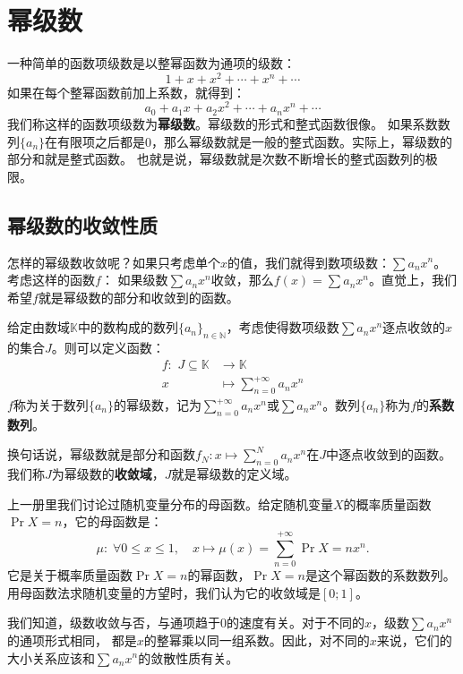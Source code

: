 \documentclass[12pt,UTF8]{ctexbook}
\begin{document}
\chapter{幂级数}

一种简单的函数项级数是以整幂函数为通项的级数：
$$ 1 + x + x^2 + \cdots + x^n + \cdots$$
如果在每个整幂函数前加上系数，就得到：
$$ a_0 + a_1x + a_2x^2 + \cdots + a_n x^n + \cdots$$
我们称这样的函数项级数为\textbf{幂级数}。幂级数的形式和整式函数很像。
如果系数数列$\{a_n\}$在有限项之后都是$0$，那么幂级数就是一般的整式函数。实际上，幂级数的部分和就是整式函数。
也就是说，幂级数就是次数不断增长的整式函数列的极限。

\section{幂级数的收敛性质}

怎样的幂级数收敛呢？如果只考虑单个$x$的值，我们就得到数项级数：$\sum a_n x^n$。考虑这样的函数$f$：
如果级数$\sum a_n x^n$收敛，那么$f(x) = \sum a_n x^n$。直觉上，我们希望$f$就是幂级数的部分和收敛到的函数。

\begin{df}
    给定由数域$\mathbb{K}$中的数构成的数列$\{a_n\}_{n\in\mathbb{N}}$，考虑使得数项级数$\sum a_n x^n$逐点收敛的$x$的集合$J$。则可以定义函数：
    $$
    \begin{array}{rl}
        f: \,\, J\subseteq \mathbb{K} &\rightarrow \mathbb{K} \\
        x &\displaystyle \mapsto \sum_{n=0}^{+\infty} a_n x^n        
    \end{array}
    $$
    $f$称为关于数列$\{a_n\}$的幂级数，记为$\sum_{n=0}^{+\infty} a_n x^n$或$\sum a_n x^n$。数列$\{a_n\}$称为$f$的\textbf{系数数列}。
\end{df}
换句话说，幂级数就是部分和函数$f_N : x\mapsto \sum_{n=0}^{N} a_n x^n$在$J$中逐点收敛到的函数。
我们称$J$为幂级数的\textbf{收敛域}，$J$就是幂级数的定义域。

\begin{ex}
    上一册里我们讨论过随机变量分布的母函数。给定随机变量$X$的概率质量函数$\Pr{X=n}$，它的母函数是：
    $$ \mu: \; \forall 0\leqslant x\leqslant 1, \quad x\mapsto \mu(x) = \sum_{n=0}^{+\infty} \Pr{X=n} x^n. $$
    它是关于概率质量函数$\Pr{X=n}$的幂函数，$\Pr{X=n}$是这个幂函数的系数数列。用母函数法求随机变量的方望时，我们认为它的收敛域是$[0;1]$。
\end{ex}

我们知道，级数收敛与否，与通项趋于$0$的速度有关。对于不同的$x$，级数$\sum a_n x^n$的通项形式相同，
都是$x$的整幂乘以同一组系数。因此，对不同的$x$来说，它们的大小关系应该和$\sum a_n x^n$的敛散性质有关。
\end{document}

